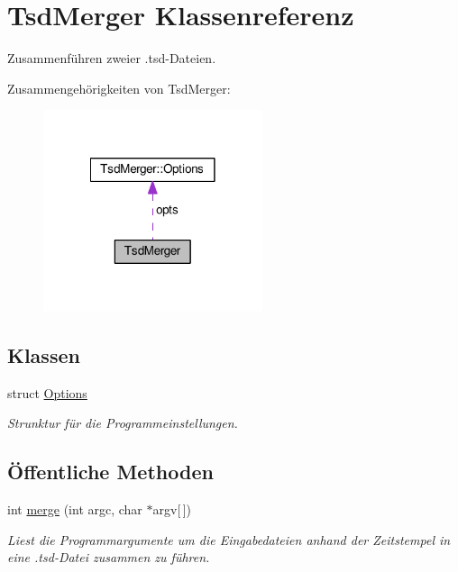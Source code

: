 \hypertarget{classTsdMerger}{\section{Tsd\-Merger Klassenreferenz}
\label{classTsdMerger}
}


Zusammenführen zweier .tsd-\/\-Dateien.  




Zusammengehörigkeiten von Tsd\-Merger\-:
\nopagebreak
\begin{figure}[H]
\begin{center}
\leavevmode
\includegraphics[width=182pt]{classTsdMerger__coll__graph}
\end{center}
\end{figure}
\subsection*{Klassen}
\begin{DoxyCompactItemize}
\item 
struct \hyperlink{structTsdMerger_1_1Options}{Options}
\begin{DoxyCompactList}\small\item\em Strunktur für die Programmeinstellungen. \end{DoxyCompactList}\end{DoxyCompactItemize}
\subsection*{Öffentliche Methoden}
\begin{DoxyCompactItemize}
\item 
int \hyperlink{classTsdMerger_aef6012e4a2b9c31440ba1f81114cda4c}{merge} (int argc, char $\ast$argv\mbox{[}$\,$\mbox{]})
\begin{DoxyCompactList}\small\item\em Liest die Programmargumente um die Eingabedateien anhand der Zeitstempel in eine .tsd-\/\-Datei zusammen zu führen. \end{DoxyCompactList}\end{DoxyCompactItemize}
